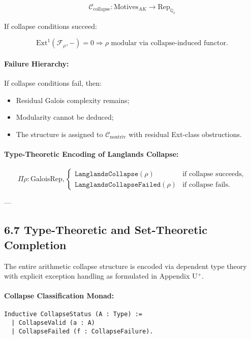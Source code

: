 \documentclass[11pt]{article}
\begin{document}
\[
\mathcal{C}_{\mathrm{collapse}} : \mathrm{Motives}_{AK} \longrightarrow \mathrm{Rep}_{\mathbb{Q}_\ell}
\]

If collapse conditions succeed:

\[
\mathrm{Ext}^1(\mathcal{F}_\rho, -) = 0 \Rightarrow \rho \text{ modular via collapse-induced functor}.
\]

\paragraph{Failure Hierarchy:}
If collapse conditions fail, then:

\begin{itemize}
    \item Residual Galois complexity remains;
    \item Modularity cannot be deduced;
    \item The structure is assigned to \( \mathcal{C}_{\mathrm{nontriv}} \) with residual Ext-class obstructions.
\end{itemize}

\paragraph{Type-Theoretic Encoding of Langlands Collapse:}

\[
\Pi \rho : \mathrm{GaloisRep},
\begin{cases}
\texttt{LanglandsCollapse}(\rho) & \text{if collapse succeeds}, \\
\texttt{LanglandsCollapseFailed}(\rho) & \text{if collapse fails}.
\end{cases}
\]

---

\subsection*{6.7 Type-Theoretic and Set-Theoretic Completion}

The entire arithmetic collapse structure is encoded via dependent type theory with explicit exception handling as formulated in Appendix U$^{+}$.

\paragraph{Collapse Classification Monad:}

\begin{lstlisting}[language=Coq]
Inductive CollapseStatus (A : Type) :=
  | CollapseValid (a : A)
  | CollapseFailed (f : CollapseFailure).
\end{lstlisting}
\end{document}
